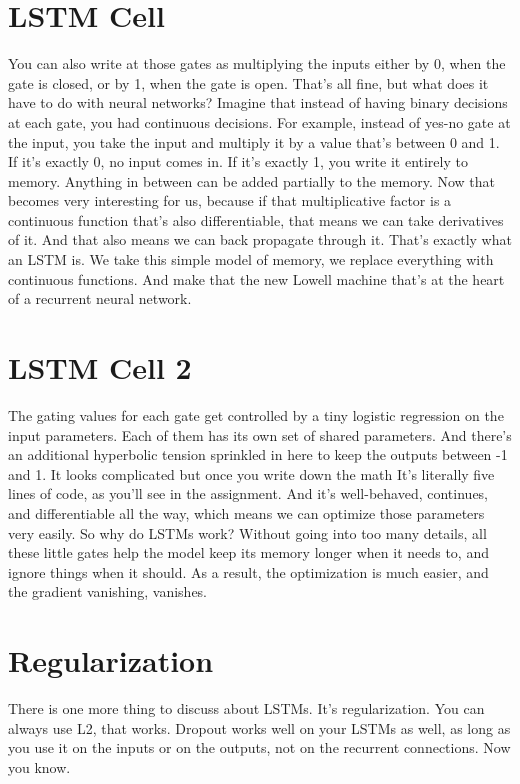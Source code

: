\documentclass{article}
\begin{document}
\section{LSTM Cell}
You can also write at those gates as
multiplying the inputs either by 0,
when the gate is closed, or
by 1, when the gate is open.
That's all fine, but what does it
have to do with neural networks?
Imagine that instead of having
binary decisions at each gate,
you had continuous decisions.
For example, instead of yes-no gate
at the input, you take the input and
multiply it by a value
that's between 0 and 1.
If it's exactly 0, no input comes in.
If it's exactly 1,
you write it entirely to memory.
Anything in between can be
added partially to the memory.
Now that becomes very interesting for
us, because if that multiplicative
factor is a continuous function
that's also differentiable, that
means we can take derivatives of it.
And that also means we can
back propagate through it.
That's exactly what an LSTM is.
We take this simple model of memory,
we replace everything with
continuous functions.
And make that the new Lowell
machine that's at the heart
of a recurrent neural network.
\section{LSTM Cell 2}
The gating values for each gate get
controlled by a tiny logistic
regression on the input parameters.
Each of them has its own
set of shared parameters.
And there's an additional hyperbolic
tension sprinkled in here
to keep the outputs between -1 and 1.
It looks complicated but
once you write down the math
It's literally five lines of code,
as you'll see in the assignment.
And it's well-behaved, continues,
and differentiable all the way,
which means we can optimize
those parameters very easily.
So why do LSTMs work?
Without going into too many details,
all these little gates help the model
keep its memory longer when it needs to,
and ignore things when it should.
As a result,
the optimization is much easier, and
the gradient vanishing, vanishes.
\section{Regularization}
There is one more thing
to discuss about LSTMs.
It's regularization.
You can always use L2, that works.
Dropout works well on your LSTMs
as well, as long as you use it
on the inputs or on the outputs,
not on the recurrent connections.
Now you know.
\end{document}
